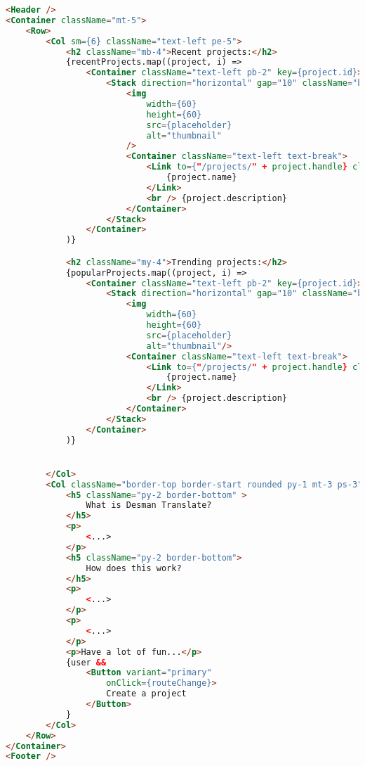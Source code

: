 \documentclass[a4paper,12pt]{article}
\begin{document}
\begin{lstlisting}[language=HTML, caption={Код на JSX, отрисовывающий главную страницу.}]
<Header />
<Container className="mt-5">
    <Row>
        <Col sm={6} className="text-left pe-5">
            <h2 className="mb-4">Recent projects:</h2>
            {recentProjects.map((project, i) =>
                <Container className="text-left pb-2" key={project.id}>
                    <Stack direction="horizontal" gap="10" className="border rounded p-3 mt-1">
                        <img
                            width={60}
                            height={60}
                            src={placeholder}
                            alt="thumbnail"
                        />
                        <Container className="text-left text-break">
                            <Link to={"/projects/" + project.handle} className="link-primary">
                                {project.name}
                            </Link>
                            <br /> {project.description}
                        </Container>
                    </Stack>
                </Container>
            )}

            <h2 className="my-4">Trending projects:</h2>
            {popularProjects.map((project, i) =>
                <Container className="text-left pb-2" key={project.id}>
                    <Stack direction="horizontal" gap="10" className="border rounded p-3 mt-1">
                        <img
                            width={60}
                            height={60}
                            src={placeholder}
                            alt="thumbnail"/>
                        <Container className="text-left text-break">
                            <Link to={"/projects/" + project.handle} className="link-primary">
                                {project.name}
                            </Link>
                            <br /> {project.description}
                        </Container>
                    </Stack>
                </Container>
            )}


        </Col>
        <Col className="border-top border-start rounded py-1 mt-3 ps-3">
            <h5 className="py-2 border-bottom" >
                What is Desman Translate?
            </h5>
            <p>
                <...>
            </p>
            <h5 className="py-2 border-bottom">
                How does this work?
            </h5>
            <p>
                <...>
            </p>
            <p>
                <...>
            </p>
            <p>Have a lot of fun...</p>
            {user && 
                <Button variant="primary"
                    onClick={routeChange}>
                    Create a project
                </Button>
            }
        </Col>
    </Row>
</Container>
<Footer />
\end{lstlisting}
\end{document}
